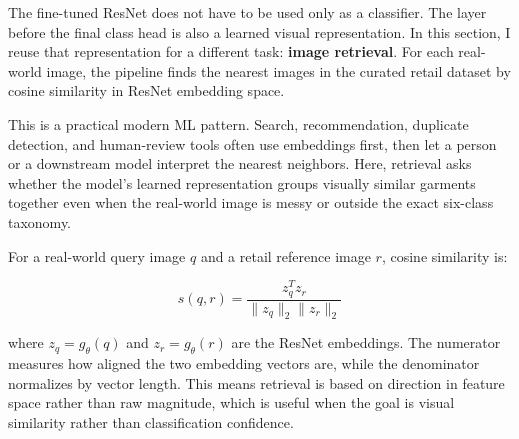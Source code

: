 \documentclass[11pt]{article}
\begin{document}
The fine-tuned ResNet does not have to be used only as a classifier. The
layer before the final class head is also a learned visual
representation. In this section, I reuse that representation for a
different task: \textbf{image retrieval}. For each real-world image, the
pipeline finds the nearest images in the curated retail dataset by
cosine similarity in ResNet embedding space.

This is a practical modern ML pattern. Search, recommendation, duplicate
detection, and human-review tools often use embeddings first, then let a
person or a downstream model interpret the nearest neighbors. Here,
retrieval asks whether the model's learned representation groups
visually similar garments together even when the real-world image is
messy or outside the exact six-class taxonomy.

For a real-world query image \(q\) and a retail reference image \(r\),
cosine similarity is:

\[
s(q, r) = \frac{z_q^T z_r}{\|z_q\|_2 \|z_r\|_2}
\]

where \(z_q = g_\theta(q)\) and \(z_r = g_\theta(r)\) are the ResNet
embeddings. The numerator measures how aligned the two embedding vectors
are, while the denominator normalizes by vector length. This means
retrieval is based on direction in feature space rather than raw
magnitude, which is useful when the goal is visual similarity rather
than classification confidence.
\end{document}
